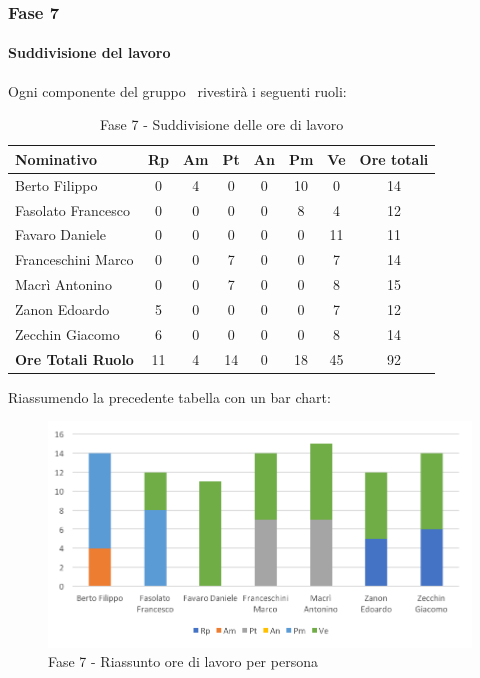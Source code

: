 \documentclass[../PianoDiProgetto.tex]{subfiles}
\begin{document}
		\newpage
		\subsubsection{Fase 7}
			\paragraph{Suddivisione del lavoro}
			Ogni componente del gruppo \kpanic\ rivestirà i seguenti ruoli:
			\begin{table}[h]
				\begin{tabularx}{\textwidth}{l * {6}{C} c}
				\toprule
				\textbf{Nominativo} & \textbf{Rp} & \textbf{Am} & \textbf{Pt} & \textbf{An} & \textbf{Pm} & \textbf{Ve} & \textbf{Ore totali} \\
				\midrule
				Berto Filippo &	0 & 4 & 0 & 0 & 10 & 0 & 14 \\
				Fasolato Francesco & 0 & 0 & 0 & 0 & 8 & 4 & 12 \\
				Favaro Daniele & 0 & 0 & 0 & 0 & 0 & 11 & 11 \\
				Franceschini Marco & 0 & 0 & 7 & 0 & 0 & 7 & 14 \\
				Macrì Antonino & 0 & 0 & 7 & 0 & 0 & 8 & 15 \\
				Zanon Edoardo &	5 & 0 & 0 & 0 & 0 & 7 & 12 \\
				Zecchin Giacomo & 6 & 0 & 0 & 0 & 0 & 8 & 14 \\
				\midrule			
				\textbf{Ore Totali Ruolo} & 11 & 4 & 14 & 0 & 18 & 45 & 92 \\
				\bottomrule
				\end{tabularx}
				\caption{Fase 7 - Suddivisione delle ore di lavoro}		
			\end{table}
			
			Riassumendo la precedente tabella con un bar chart:	
			\begin{figure}[!h]
				\centering
				\includegraphics[width=\textwidth]{Preventivo/Immagini/fase7_oreRuoloPersona.png}
				\caption{Fase 7 - Riassunto ore di lavoro per persona}
			\end{figure}	
\end{document}
